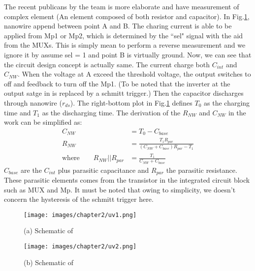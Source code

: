 The recent publicans \cite{Juv2} by the team is more elaborate and have measurement of complex element (An element composed of both resistor and capacitor).
In Fig.\ref{fig:tot2}, nanowire append between point A and B.
The charing current is able to be applied from Mp1 or Mp2, which is determined by the ``sel" signal with the aid from the MUXs.
This is simply mean to perform a reverse measurement and we ignore it by assume sel = 1 and point B is virtually ground.
Now, we can see that the circuit design concept is actually same.
The current charge both $C_{int}$ and $C_{NW}$.
When the voltage at A exceed the threshold voltage, the output switches to off and feedback to turn off the Mp1.
(To be noted that the inverter at the output satge in \cite{Juv1} is replaced by a schmitt trigger.)
Then the capacitor discharges through nanowire ($r_{ds}$).
The right-bottom plot in Fig.\ref{fig:tot2} defines $T_0$ as the charging time and $T_1$ as the discharging time.
The derivation of the $R_{NW}$ and $C_{NW}$ in the work can be simplified as:
\setlength{\mathindent}{2cm}
\begin{align}
                         C_{NW}            & = T_0 - C_{base}\\
                         R_{NW}            & = \frac{T_1R_{par}}{(C_{NW} + C_{base})R_{par} - T_1}\\
    \text{where} \qquad  R_{NW} || R_{par} & = \frac{T_1}{C_{NW} + C_{base}}
\end{align}
$C_{base}$ are the $C_{int}$ plus parasitic capacitance and $R_{par}$ the parasitic resistance.
These parasitic elements comes from the transistor in the integrated circuit block such as MUX and Mp.
It must be noted that owing to simplicity, we doesn't concern the hysteresis of the schmitt trigger here.

\begin{figure}[!htbp]
    \begin{minipage}[t][0.1\textheight]{0.6\textwidth}
        \centering
        \texttt{[image: images/chapter2/uv1.png]}
        \caption{(a) Schematic of \cite{Juv1}}
        \label{fig:tot1}
    \end{minipage}
    \hfill
    \begin{minipage}[t][0.1\textheight]{0.4\textwidth}
        \centering
        \texttt{[image: images/chapter2/uv2.png]}
        \caption{(b) Schematic of \cite{Juv2}}
        \label{fig:tot2}
    \end{minipage}
    \fontsize{6}{7}\selectfont
\end{figure}

